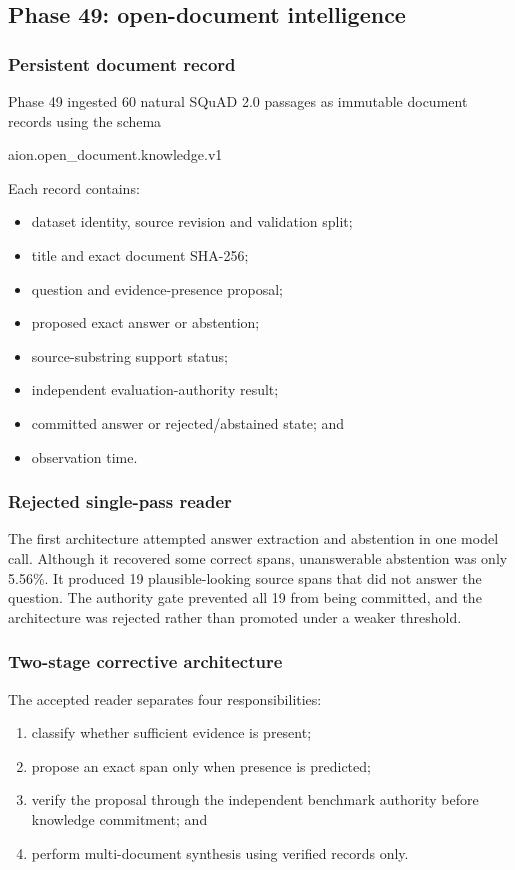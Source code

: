 \subsection{Phase 49: open-document intelligence}
\label{subsec:phase49-open-documents}

\subsubsection{Persistent document record}

Phase 49 ingested 60 natural SQuAD 2.0 passages as immutable document
records using the schema
\begin{center}
\small\ttfamily
aion.open\_document.knowledge.v1
\end{center}
Each record contains:
\begin{itemize}
    \item dataset identity, source revision and validation split;
    \item title and exact document SHA-256;
    \item question and evidence-presence proposal;
    \item proposed exact answer or abstention;
    \item source-substring support status;
    \item independent evaluation-authority result;
    \item committed answer or rejected/abstained state; and
    \item observation time.
\end{itemize}

\subsubsection{Rejected single-pass reader}

The first architecture attempted answer extraction and abstention in one
model call.  Although it recovered some correct spans, unanswerable
abstention was only 5.56\%.  It produced 19 plausible-looking source spans
that did not answer the question.  The authority gate prevented all 19 from
being committed, and the architecture was rejected rather than promoted
under a weaker threshold.

\subsubsection{Two-stage corrective architecture}

The accepted reader separates four responsibilities:
\begin{enumerate}
    \item classify whether sufficient evidence is present;
    \item propose an exact span only when presence is predicted;
    \item verify the proposal through the independent benchmark authority
    before knowledge commitment; and
    \item perform multi-document synthesis using verified records only.
\end{enumerate}

